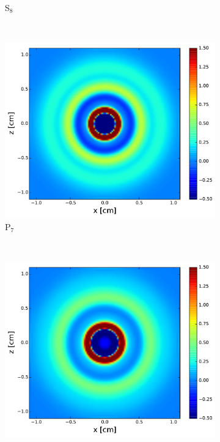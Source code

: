 \documentclass[review]{elsarticle}
\begin{document}
\begin{figure}[ht!]
\begin{subfigure}{.5\textwidth}
		\caption{S$_8$}
		\label{f:s8}
	\end{subfigure}
	~
	\begin{subfigure}{.5\textwidth}
		\centering
		\hspace*{-1cm}\includegraphics[width=1.\linewidth]{p7.pdf}
		\caption{P$_7$}
		\label{f:p7}
	\end{subfigure}
	~
	\begin{subfigure}{.5\textwidth}
		\centering
		\includegraphics[width=1.\linewidth]{d6.pdf}

\end{subfigure}
\end{figure}
\end{document}
